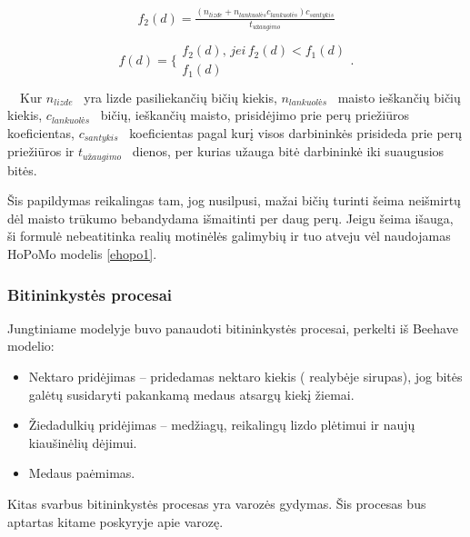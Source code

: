 \documentclass{VUMIFKompMagistrinis}
\begin{document}
\begin{equation}
\label{ekd3}
\begin{matrix}f_2(d)=\frac{(n_{\mathit{lizde}}+n_{\mathit{lankuol\text{\.e}s}}c_{\mathit{lankuol\text{\.e}s}})c_{\mathit{santykis}}}{t_{\mathit{u\text{\v{z}}augimo}}}\\\end{matrix}
\end{equation}
\begin{equation}
\label{ehopo1}
\begin{matrix}f(d)=\{\begin{matrix}f_2(d),\,jei\,f_2(d)<f_1(d)\\f_1(d)\end{matrix}.\\\end{matrix}
\end{equation}
\ \ Kur  $n_{\mathit{lizde}}$ \ yra lizde pasiliekan\v{c}i\k{u} bi\v{c}i\k{u} kiekis,  $n_{\mathit{lankuol\text{\.e}s}}$ \ maisto ie\v{s}kan\v{c}i\k{u} bi\v{c}i\k{u} kiekis,  $c_{\mathit{lankuol\text{\.e}s}}$ \ bi\v{c}i\k{u}, ie\v{s}kan\v{c}i\k{u} maisto, prisid\.ejimo prie per\k{u} prie\v{z}i\=uros koeficientas,  $c_{\mathit{santykis}}$ \ koeficientas pagal kur\k{i} visos darbinink\.es prisideda prie per\k{u} prie\v{z}i\=uros ir  $t_{\mathit{u\text{\v{z}}augimo}}$ \ dienos, per kurias u\v{z}auga bit\.e darbinink\.e iki suaugusios bit\.es.

\v{S}is papildymas reikalingas tam, jog nusilpusi, ma\v{z}ai bi\v{c}i\k{u} turinti \v{s}eima nei\v{s}mirt\k{u} d\.el maisto tr\=ukumo bebandydama i\v{s}maitinti per daug per\k{u}. Jeigu \v{s}eima i\v{s}auga, \v{s}i formul\.e nebeatitinka reali\k{u} motin\.el\.es galimybi\k{u} ir tuo atveju v\.el naudojamas HoPoMo modelis \eqref{ehopo1}.

\subsubsection{Bitininkyst\.es procesai}
Jungtiniame modelyje buvo panaudoti bitininkystės procesai, perkelti iš Beehave modelio:

\begin{itemize}
\item Nektaro prid\.ejimas -- pridedamas nektaro kiekis ( realyb\.eje sirupas), jog bit\.es gal\.et\k{u} susidaryti pakankam\k{a} medaus atsarg\k{u} kiek\k{i} \v{z}iemai.
\item \v{Z}iedadulki\k{u} prid\.ejimas -- med\v{z}iag\k{u}, reikaling\k{u} lizdo pl\.etimui ir nauj\k{u} kiau\v{s}in\.eli\k{u} d\.ejimui.
\item Medaus pa\.emimas.
\end{itemize}
Kitas svarbus bitininkyst\.es procesas yra varoz\.es gydymas. \v{S}is procesas bus aptartas kitame poskyryje apie varoz\k{e}.
\end{document}
